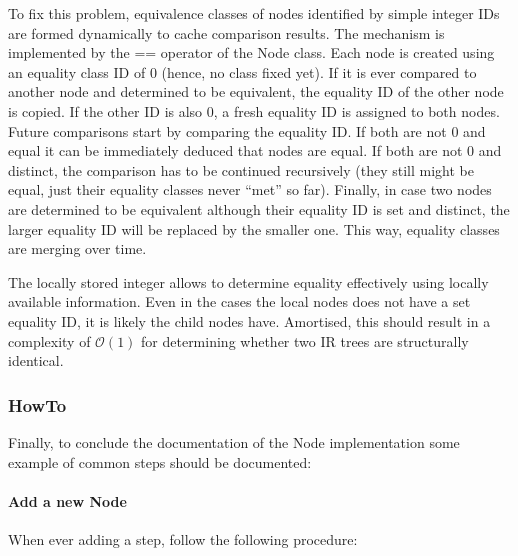 To fix this problem, equivalence classes of nodes identified by simple integer
IDs are formed dynamically to cache comparison results. The mechanism is
implemented by the == operator of the Node class. Each node is created using an
equality class ID of 0 (hence, no class fixed yet). If it is ever compared to
another node and determined to be equivalent, the equality ID of the other node
is copied. If the other ID is also 0, a fresh equality ID is assigned to both
nodes. Future comparisons start by comparing the equality ID.
If both are not 0 and equal it can be immediately deduced that nodes are equal. If both are
not 0 and distinct, the comparison has to be continued recursively (they still
might be equal, just their equality classes never ``met'' so far). Finally, in
case two nodes are determined to be equivalent although their equality ID is set
and distinct, the larger equality ID will be replaced by the smaller one. This
way, equality classes are merging over time.

The locally stored integer allows to determine equality effectively using
locally available information. Even in the cases the local nodes does not have a
set equality ID, it is likely the child nodes have. Amortised, this should
result in a complexity of $\mathcal{O}(1)$ for determining whether two IR trees
are structurally identical.


  

\subsubsection{HowTo}
Finally, to conclude the documentation of the Node implementation some example
of common steps should be documented:

 \paragraph{Add a new Node} When ever adding a step, follow the following
 procedure:
 
